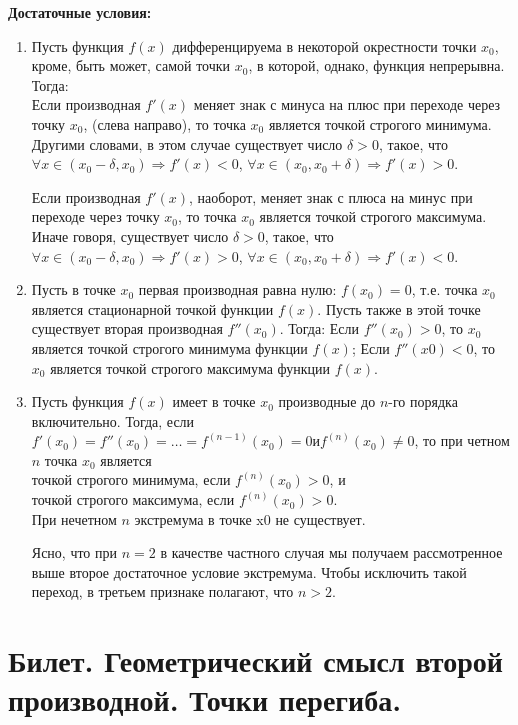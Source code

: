 \documentclass[12pt]{article}
\begin{document}
	\textbf{Достаточные условия:} \begin{enumerate}
		\item Пусть функция $f(x)$ дифференцируема в некоторой окрестности точки $x_0$, кроме, быть может, самой точки $x_0$, в которой, однако, функция непрерывна. Тогда:\\
		Если производная $f′(x)$ меняет знак с минуса на плюс при переходе через точку $x_0$, (слева направо), то точка $x_0$ является точкой строгого минимума. Другими словами, в этом случае существует число $\delta>0$, такое, что
		$\forall x \in (x_0-\delta,x_0) \Rightarrow f'(x)<0$,
		$\forall x \in (x_0,x_0+\delta) \Rightarrow f'(x)>0$.
		
		Если производная $f′(x)$, наоборот, меняет знак с плюса на минус при переходе через точку $x_0$, то точка $x_0$ является точкой строгого максимума. Иначе говоря, существует число $\delta>0$, такое, что
		$\forall x \in (x_0-\delta,x_0) \Rightarrow f'(x)>0$,
		$\forall x \in (x_0,x_0+\delta) \Rightarrow f'(x)<0$.
		\item Пусть в точке $x_0$ первая производная равна нулю: $f(x_0)=0$, т.е. точка $x_0$ является стационарной точкой функции $f(x)$. Пусть также в этой точке существует вторая производная $f''(x_0)$. Тогда:
		Если $f''(x_0)>0$, то $x_0$ является точкой строгого минимума функции $f(x)$;
		Если $f''(x0)<0$, то $x_0$ является точкой строгого максимума функции $f(x)$.
		\item Пусть функция $f(x)$ имеет в точке $x_0$ производные до $n$-го порядка включительно. Тогда, если
		$f'(x_0)=f''(x_0)=\dots=f^{(n−1)}(x_0)=0иf^(n)(x_0)\not=0$,
		то при четном $n$ точка $x_0$ является\\
		точкой строгого минимума, если $f^(n)(x_0)>0$, и\\
		точкой строгого максимума, если $f^(n)(x_0)>0$.\\
		При нечетном $n$ экстремума в точке x0 не существует. 
		
		Ясно, что при $n=2$ в качестве частного случая мы получаем рассмотренное выше второе достаточное условие экстремума. Чтобы исключить такой переход, в третьем признаке полагают, что $n>2$. 
	\end{enumerate}
	
	\section{Билет. Геометрический смысл второй производной. Точки перегиба.}
	
	
	
\end{document}
